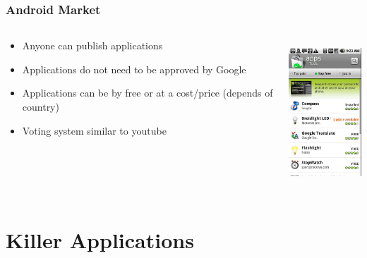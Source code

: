 \documentclass{beamer}
\begin{document}
\begin{frame}
\frametitle{Android Market}

\begin{columns}
\begin{column}{0.6\textwidth}
\begin{itemize}
\item Anyone can publish applications
\item Applications do not need to be approved by Google
\item Applications can be by free or at a cost/price (depends of country)
\item Voting system similar to youtube
\end{itemize}
\end{column}

\begin{column}{0.4\textwidth}
\begin{center}
  \includegraphics[height=5.5cm]{figs/android-market}
\end{center}

\end{column}
\end{columns}
\end{frame}


\section{Killer Applications}
\end{document}
